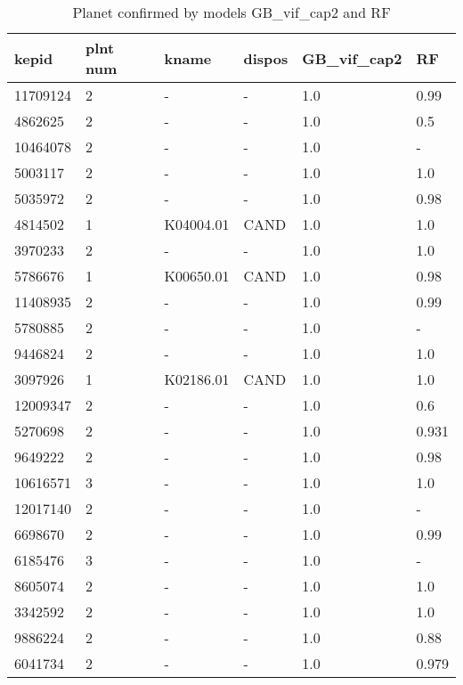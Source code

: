 \begin{table}[!htbp]
 \centering
 \caption{Planet confirmed by models GB\_vif\_cap2 and RF}
 \label{dataGBvifcap2RFcreftab} 
  \begin{tabular}
{| 
 p{}| 
 p{}| 
 p{}| 
 p{}| 
 p{}| 
 p{}| 
}\hline 
\textbf{kepid} &\textbf{plnt num} &\textbf{kname} &\textbf{dispos} &\textbf{GB\_vif\_cap2} &\textbf{RF} \\ \hline 
11709124 &2 &- &- &1.0 &0.99 \\ \hline 
4862625 &2 &- &- &1.0 &0.5 \\ \hline 
10464078 &2 &- &- &1.0 &- \\ \hline 
5003117 &2 &- &- &1.0 &1.0 \\ \hline 
5035972 &2 &- &- &1.0 &0.98 \\ \hline 
4814502 &1 &K04004.01 &CAND &1.0 &1.0 \\ \hline 
3970233 &2 &- &- &1.0 &1.0 \\ \hline 
5786676 &1 &K00650.01 &CAND &1.0 &0.98 \\ \hline 
11408935 &2 &- &- &1.0 &0.99 \\ \hline 
5780885 &2 &- &- &1.0 &- \\ \hline 
9446824 &2 &- &- &1.0 &1.0 \\ \hline 
3097926 &1 &K02186.01 &CAND &1.0 &1.0 \\ \hline 
12009347 &2 &- &- &1.0 &0.6 \\ \hline 
5270698 &2 &- &- &1.0 &0.931 \\ \hline 
9649222 &2 &- &- &1.0 &0.98 \\ \hline 
10616571 &3 &- &- &1.0 &1.0 \\ \hline 
12017140 &2 &- &- &1.0 &- \\ \hline 
6698670 &2 &- &- &1.0 &0.99 \\ \hline 
6185476 &3 &- &- &1.0 &- \\ \hline 
8605074 &2 &- &- &1.0 &1.0 \\ \hline 
3342592 &2 &- &- &1.0 &1.0 \\ \hline 
9886224 &2 &- &- &1.0 &0.88 \\ \hline 
6041734 &2 &- &- &1.0 &0.979 \\ \hline 

\end{tabular}
\end{table}
